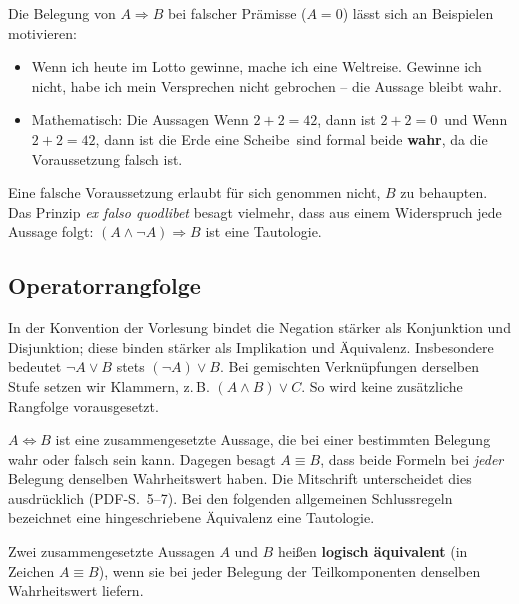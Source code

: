 \begin{bemerkung}
Die Belegung von $A \Rightarrow B$ bei falscher Prämisse ($A = 0$) lässt sich an Beispielen motivieren:
\begin{itemize}
    \item \glqq Wenn ich heute im Lotto gewinne, mache ich eine Weltreise.\grqq\newline
    Gewinne ich nicht, habe ich mein Versprechen nicht gebrochen -- die Aussage bleibt wahr.
    \item Mathematisch: Die Aussagen \glqq Wenn $2+2=42$, dann ist $2+2=0$\grqq\ und \glqq Wenn $2+2=42$, dann ist die Erde eine Scheibe\grqq\ sind formal beide \textbf{wahr}, da die Voraussetzung falsch ist.
\end{itemize}
Eine falsche Voraussetzung erlaubt für sich genommen nicht, $B$ zu behaupten.
Das Prinzip \emph{ex falso quodlibet} besagt vielmehr, dass aus einem
Widerspruch jede Aussage folgt: $(A\land\neg A)\Rightarrow B$ ist eine Tautologie.
\end{bemerkung}

\subsection*{Operatorrangfolge}
In der Konvention der Vorlesung bindet die Negation stärker als
Konjunktion und Disjunktion; diese binden stärker als Implikation und
Äquivalenz. Insbesondere bedeutet $\neg A\lor B$ stets $(\neg A)\lor B$.
Bei gemischten Verknüpfungen derselben Stufe setzen wir Klammern,
z.\,B. $(A\land B)\lor C$. So wird keine zusätzliche Rangfolge vorausgesetzt.

\begin{bemerkung}
$A\Leftrightarrow B$ ist eine zusammengesetzte Aussage, die bei einer
bestimmten Belegung wahr oder falsch sein kann. Dagegen besagt
$A\equiv B$, dass beide Formeln bei \emph{jeder} Belegung denselben
Wahrheitswert haben. Die Mitschrift unterscheidet dies ausdrücklich
(PDF-S.~5--7). Bei den folgenden allgemeinen Schlussregeln bezeichnet
eine hingeschriebene Äquivalenz eine Tautologie.
\end{bemerkung}

\begin{definition}
Zwei zusammengesetzte Aussagen $A$ und $B$ heißen \textbf{logisch äquivalent} (in Zeichen $A \equiv B$), wenn sie bei jeder Belegung der Teilkomponenten denselben Wahrheitswert liefern.
\end{definition}

